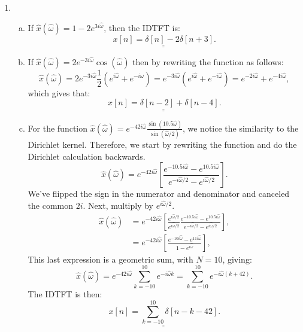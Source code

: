 \begin{enumerate}
  \item
        \begin{enumerate}[a)]
          \item If $\hat{x}(\hat{\omega})=1-2e^{3i\hat{\omega}}$, then the IDTFT is:
                \[ \underline{\underline{x[n] = \delta[n] - 2\delta[n + 3]}}. \]

          \item If $\hat{x}(\hat{\omega})=2e^{-3i\hat{\omega}}\cos(\hat{\omega})$ then by rewriting the function as follows:
                \[ \hat{x}(\hat{\omega})=2e^{-3i\hat{\omega}}\frac{1}{2}(e^{i\hat{\omega}}+e^{-i\hat{\omega}})=e^{-3i\hat{\omega}}(e^{i\hat{\omega}}+e^{-i\hat{\omega}})=e^{-2i\hat{\omega}}+e^{-4i\hat{\omega}}, \]
                which gives that:
                \[ \underline{\underline{x[n] = \delta[n - 2] + \delta[n - 4]}}. \]

          \item For the function $\hat{x}(\hat{\omega}) = e^{-42i\hat{\omega}}\frac{\sin(10.5\hat{\omega})}{\sin(\hat{\omega}/2)}$, we notice
                the similarity to the Dirichlet kernel. Therefore, we start by rewriting the function and do the Dirichlet calculation
                backwards. 
                \[ \hat{x}(\hat{\omega}) = e^{-42i\hat{\omega}}\left[ \frac{e^{-10.5i\hat{\omega}} - e^{10.5i\hat{\omega}}}{e^{-i\hat{\omega}/2} - e^{i\hat{\omega}/2}} \right]. \]
                We've flipped the sign in the numerator and denominator and canceled the common $2i$. Next, multiply by $e^{i\hat{\omega}/2}$.
                \begin{align*}
                  \hat{x}(\hat{\omega}) &= e^{-42i\hat{\omega}}\left[ \frac{e^{i\hat{\omega}/2}}{e^{i\hat{\omega}/2}}\frac{e^{-10.5i\hat{\omega}} - e^{10.5i\hat{\omega}}}{e^{-i\hat{\omega}/2} - e^{i\hat{\omega}/2}} \right], \\
                                        &= e^{-42i\hat{\omega}}\left[ \frac{e^{-10i\hat{\omega}} - e^{11i\hat{\omega}}}{1 - e^{i\hat{\omega}}} \right],
                \end{align*}
                This last expression is a geometric sum, with $N = 10$, giving:
                \[ \hat{x}(\hat{\omega}) = e^{-42i\hat{\omega}}\sum_{k = -10}^{10}e^{-i\hat{\omega}k} = \sum_{k = -10}^{10}e^{-i\hat{\omega}(k + 42)}. \]
                The IDTFT is then:
                \[ \underline{\underline{x[n] = \sum_{k = -10}^{10}\delta[n - k - 42]}}. \]

        \end{enumerate}

\end{enumerate}